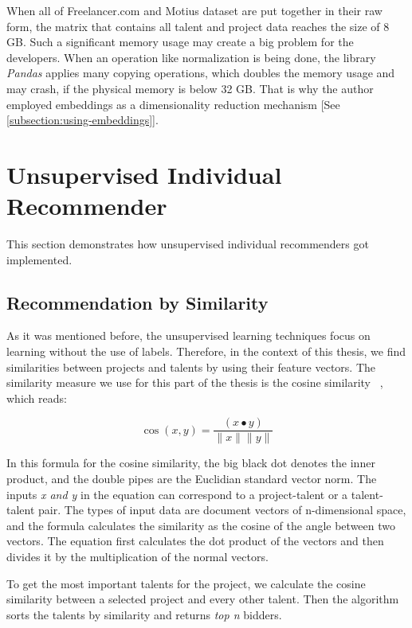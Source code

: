 When all of Freelancer.com and Motius dataset are put together in their raw form, the matrix that contains all talent and project data reaches the size of 8 GB. Such a significant memory usage may create a big problem for the developers. When an operation like normalization is being done, the library \textit{Pandas} applies many copying operations, which doubles the memory usage and may crash, if the physical memory is below 32 GB. That is why the author employed embeddings as a dimensionality reduction mechanism [See \ref{subsection:using-embeddings}].




\section{Unsupervised Individual Recommender}\label{implementation-unsupervised-individual}

This section demonstrates how unsupervised individual recommenders got implemented.

\subsection{Recommendation by Similarity}\label{implementation-unsupervised-similarity}

As it was mentioned before, the unsupervised learning techniques focus on learning without the use of labels. Therefore, in the context of this thesis, we find similarities between projects and talents by using their feature vectors. The similarity measure we use for this part of the thesis is the cosine similarity ~\parencite{amatriain2011data}, which reads:



\begin{equation}
\cos (x, y)=\frac{(x \bullet y)}{\|x\|\|y\|}
\end{equation}


In this formula for the cosine similarity, the big black dot denotes the inner product, and the double pipes are the Euclidian standard vector norm. The inputs  \textit{x and y} in the equation can correspond to a project-talent or a talent-talent pair. The types of input data are document vectors of n-dimensional space, and the formula calculates the similarity as the cosine of the angle between two vectors. The equation first calculates the dot product of the vectors and then divides it by the multiplication of the normal vectors.


To get the most important talents for the project, we calculate the cosine similarity between a selected project and every other talent. Then the algorithm sorts the talents by similarity and returns \textit{top n} bidders.



